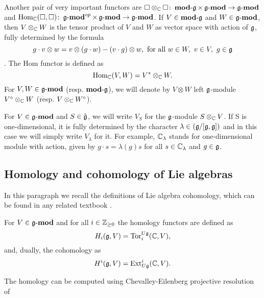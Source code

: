 Another pair of very important functors are $\square \otimes_{\mathbb{C}} \square \colon \operatorname{\mathbf{mod-\mathfrak{g}}} \times
\operatorname{\mathbf{\mathfrak{g}-mod}} \to \operatorname{\mathbf{\mathfrak{g}-mod}}$ and $\operatorname{Hom}_{\mathbb{C}}(\square, \square)\colon \operatorname{\mathbf{\mathfrak{g}-mod}}^{op} \times
\operatorname{\mathbf{\mathfrak{g}-mod}} \to \operatorname{\mathbf{\mathfrak{g}-mod}}$. If $V \in \operatorname{\mathbf{mod-\mathfrak{g}}}$ and $W \in \operatorname{\mathbf{\mathfrak{g}-mod}}$, then $V \otimes_{\mathbb{C}} W$
is the tensor product of $V$ and $W$ as vector space with action of $\mathfrak{g}$, fully determined by the
formula
\[
    g\cdot v\otimes w = v\otimes (g\cdot w) - (v\cdot g) \otimes w, \text{ for all } w\in W,~v\in
    V,~ g\in \mathfrak{g} 
\].
The Hom functor is defined as 
\[
    \operatorname{Hom}_{\mathbb{C}}(V, W)=V^* \otimes_{\mathbb{C}} W.
\]
For $V, W \in \operatorname{\mathbf{\mathfrak{g}-mod}}$ (resp. $\operatorname{\mathbf{mod-\mathfrak{g}}}$), we will denote by $V\otimes W$ left $\mathfrak{g}$-module
$V^\circ \otimes_{\mathbb{C}} W$ (resp. $V \otimes_{\mathbb{C}} W^\circ$).

For $V\in \operatorname{\mathbf{\mathfrak{g}-mod}}$ and $S \in \hat{\mathfrak{g}}$, we will write $V_{S}$ for the $\mathfrak{g}$-module $S\otimes_{\mathbb{C}} V$. 
If S is one-dimensional, it is fully determined by the character $\lambda \in (\mathfrak{g}/[\mathfrak{g},
\mathfrak{g}])$ and in this case we will simply write $V_\lambda$ for it. For example, $\mathbb{C}_\lambda$
stands for one-dimensional module with action, given by $g\cdot s = \lambda(g)s$ for all $s\in
\mathbb{C}_\lambda$ and $g \in \mathfrak{g}$.  

\subsection{Homology and cohomology of Lie algebras}
In this paragraph we recall the definitions of Lie algebra cohomology, which can be found in any
related textbook .


\begin{definition}
    For $V\in \operatorname{\mathbf{\mathfrak{g}-mod}}$ and for all $i\in \mathbb{Z}_{\geq0}$ the homology functors are defined as 
    \begin{equation}
        H_i(\mathfrak{g}, V) = \mathrm{Tor}_i^{U\mathfrak{g}}(\mathbb{C}, V),
    \end{equation}
    and, dually, the cohomology as
    \begin{equation}
        H^i(\mathfrak{g}, V) = \operatorname{Ext}^i_{U\mathfrak{g}}(\mathbb{C}, V).
    \end{equation}
\end{definition}

The homology can be computed using Chevalley-Eilenberg projective resolution of

